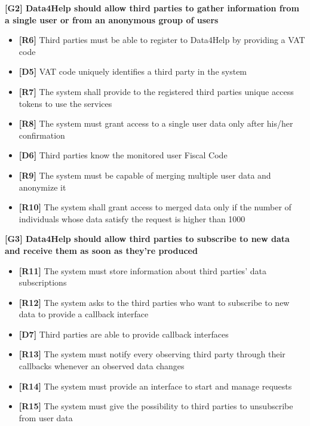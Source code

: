 \textbf{[G2] Data4Help should allow third parties to gather information from a single user or from an anonymous group of users}
\begin{itemize}
	\item \textbf{[R6]} Third parties must be able to register to Data4Help by providing a VAT code
	\item \textbf{[D5]} VAT code uniquely identifies a third party in the system
	\item \textbf{[R7]} The system shall provide to the registered third parties unique access tokens to use the services
	\item \textbf{[R8]} The system must grant access to a single user data only after his/her confirmation
	\item \textbf{[D6]} Third parties know the monitored user Fiscal Code
	\item \textbf{[R9]} The system must be capable of merging multiple user data and anonymize it
	\item \textbf{[R10]} The system shall grant access to merged data only if the number	of individuals	whose data satisfy the request is higher than	 1000
\end{itemize}

\textbf{[G3] Data4Help should allow third parties to subscribe to new data and receive them as soon as they're produced}

\begin{itemize}
	\item \textbf{[R11]} The system must store information about third parties' data subscriptions
	\item \textbf{[R12]} The system asks to the third parties who want to subscribe to new data to provide a callback interface
	\item \textbf{[D7]} Third parties are able to provide callback interfaces
	\item \textbf{[R13]} The system must notify every observing third party through their callbacks whenever an observed data changes
	\item \textbf{[R14]} The system must provide an interface to start and manage requests
	\item \textbf{[R15]} The system must give the possibility to third parties to unsubscribe from user data
\end{itemize}

